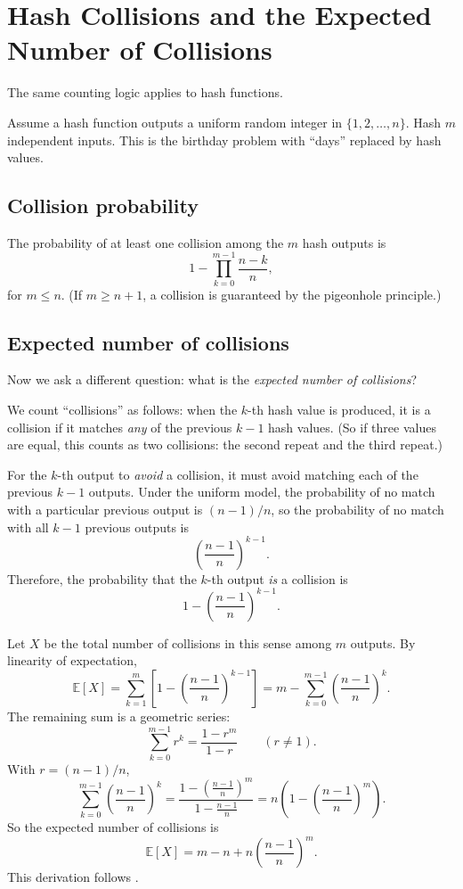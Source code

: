 \section{Hash Collisions and the Expected Number of Collisions}
The same counting logic applies to hash functions.

Assume a hash function outputs a uniform random integer in
\(\{1,2,\dots,n\}\). Hash \(m\) independent inputs. This is the birthday problem
with ``days'' replaced by hash values.

\subsection*{Collision probability}
The probability of at least one collision among the \(m\) hash outputs is
\[
1-\prod_{k=0}^{m-1}\frac{n-k}{n},
\]
for \(m\le n\). (If \(m\ge n+1\), a collision is guaranteed by the pigeonhole
principle.)

\subsection*{Expected number of collisions}
Now we ask a different question: what is the \emph{expected number of
collisions}?

We count ``collisions'' as follows: when the \(k\)-th hash value is produced,
it is a collision if it matches \emph{any} of the previous \(k-1\) hash values.
(So if three values are equal, this counts as two collisions: the second repeat
and the third repeat.)

For the \(k\)-th output to \emph{avoid} a collision, it must avoid matching each
of the previous \(k-1\) outputs. Under the uniform model, the probability of no
match with a particular previous output is \((n-1)/n\), so the probability of
no match with all \(k-1\) previous outputs is
\[
\left(\frac{n-1}{n}\right)^{k-1}.
\]
Therefore, the probability that the \(k\)-th output \emph{is} a collision is
\[
1-\left(\frac{n-1}{n}\right)^{k-1}.
\]

Let \(X\) be the total number of collisions in this sense among \(m\) outputs.
By linearity of expectation,
\[
\mathbb{E}[X]
=\sum_{k=1}^{m}\left[1-\left(\frac{n-1}{n}\right)^{k-1}\right]
= m-\sum_{k=0}^{m-1}\left(\frac{n-1}{n}\right)^k.
\]
The remaining sum is a geometric series:
\[
\sum_{k=0}^{m-1}r^k=\frac{1-r^{m}}{1-r}\qquad (r\ne 1).
\]
With \(r=(n-1)/n\),
\[
\sum_{k=0}^{m-1}\left(\frac{n-1}{n}\right)^k
=\frac{1-\left(\frac{n-1}{n}\right)^m}{1-\frac{n-1}{n}}
=n\left(1-\left(\frac{n-1}{n}\right)^m\right).
\]
So the expected number of collisions is
\[
\boxed{
\mathbb{E}[X]
= m-n+n\left(\frac{n-1}{n}\right)^m.
}
\]
This derivation follows \cite{might:hash-collisions}.

